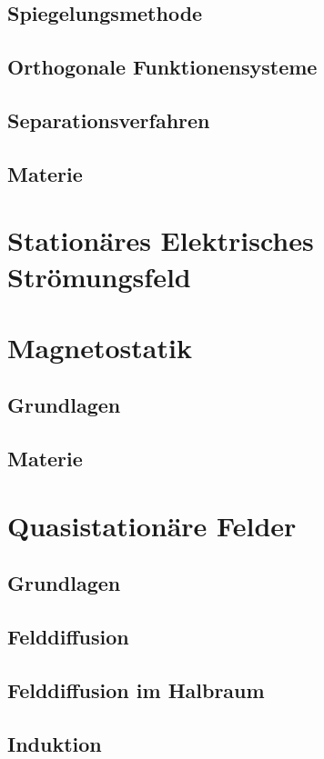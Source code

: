 \subsection{Spiegelungsmethode}

\subsection{Orthogonale Funktionensysteme}

\subsection{Separationsverfahren}

\subsection{Materie}

\section{Stationäres Elektrisches Strömungsfeld}

\section{Magnetostatik}
\subsection{Grundlagen}

\subsection{Materie}

\section{Quasistationäre Felder}
\subsection{Grundlagen}

\subsection{Felddiffusion}

\subsection{Felddiffusion im Halbraum}

\subsection{Induktion}


